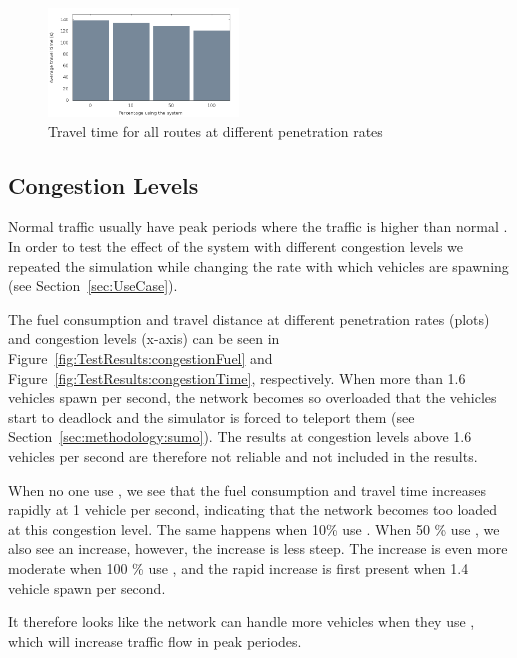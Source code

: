 \begin{figure}[htb]
\includegraphics[width=0.45\textwidth]{../images/tp0c0_8/combinedTime.png}
\caption{Travel time for all routes at different penetration rates}
\label{fig:TestResults:combinedTime}
\end{figure}

\subsection{Congestion Levels}
Normal traffic usually have peak periods where the traffic is higher than normal \cite{Vejdir}. 
In order to test the effect of the system with different congestion levels we repeated the simulation while changing the rate with which vehicles are spawning (see Section~\ref{sec:UseCase}). 

The fuel consumption and travel distance at different penetration rates (plots) and congestion levels (x-axis) can be seen in Figure~\ref{fig:TestResults:congestionFuel} and Figure~\ref{fig:TestResults:congestionTime}, respectively. 
When more than 1.6 vehicles spawn per second, the network becomes so overloaded that the vehicles start to deadlock and the simulator is forced to teleport them (see Section~\ref{sec:methodology:sumo}).
The results at congestion levels above 1.6 vehicles per second are therefore not reliable and not included in the results.

When no one use \tech, we see that the fuel consumption and travel time increases rapidly at 1 vehicle per second, indicating that the network becomes too loaded at this congestion level. 
The same happens when 10\% use \tech. 
When 50 \% use \tech, we also see an increase, however, the increase is less steep.
The increase is even more moderate when 100 \% use \tech, and the rapid increase is first present when 1.4 vehicle spawn per second.

It therefore looks like the network can handle more vehicles when they use \tech, which will increase traffic flow in peak periodes.

